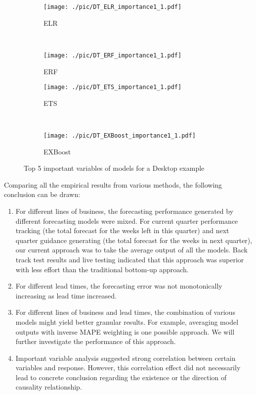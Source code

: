 \documentclass{llncs}
\begin{document}
\begin{figure}[ht]
\centering
\begin{subfigure}{0.4\textwidth}
 \centering
    \texttt{[image: ./pic/DT\_ELR\_importance1\_1.pdf]}
    \caption{ELR}
    \label{fig:LR_importance}
\end{subfigure}   
~
\begin{subfigure}{0.4\textwidth}
 \centering
    \texttt{[image: ./pic/DT\_ERF\_importance1\_1.pdf]}
    \caption{ERF}
    \label{fig:RF_importance}
\end{subfigure}


\begin{subfigure}{0.4\textwidth}
 \centering
    \texttt{[image: ./pic/DT\_ETS\_importance1\_1.pdf]}
    \caption{ETS}
    \label{fig:TS_importance}
\end{subfigure} 
~
\begin{subfigure}{0.4\textwidth}
 \centering
    \texttt{[image: ./pic/DT\_EXBoost\_importance1\_1.pdf]}
    \caption{EXBoost}
    \label{fig:Boost_importance}
\end{subfigure}
\caption{Top 5 important variables of models for a Desktop example}
\label{fig:importance}
\end{figure}


Comparing all the empirical results from various methods, the following conclusion can be drawn:
\begin{enumerate}
\item For different lines of business, the forecasting performance generated by different forecasting models were mixed. For current quarter performance tracking (the total forecast for the weeks left in this quarter) and next quarter guidance generating (the total forecast for the weeks in next quarter), our current approach was to take the average output of all the models. Back track test results and live testing indicated that this approach was superior with less effort than the traditional bottom-up approach.
\item For different lead times, the forecasting error was not monotonically increasing as lead time increased.
\item For different lines of business and lead times, the combination of various models might yield better granular results. For example, averaging model outputs with inverse MAPE weighting is one possible approach. We will further investigate the performance of this approach.
\item Important variable analysis suggested strong correlation between certain variables and response. However, this correlation effect did not necessarily lead to concrete conclusion regarding the existence or the direction of causality relationship.
\end{enumerate}
\end{document}
